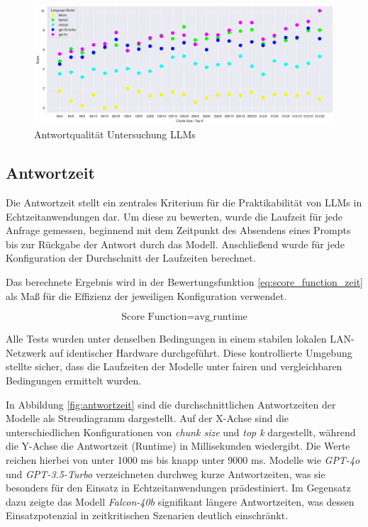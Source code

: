 \begin{figure}[H]
    \centering
    \includegraphics[width=1\textwidth]{img/antwortquali.png}
    \caption{Antwortqualität Untersuchung \acp{LLM}}
    \label{fig:antwortqualität}
\end{figure}

\subsection{Antwortzeit}

Die Antwortzeit stellt ein zentrales Kriterium für die Praktikabilität von \acp{LLM} in Echtzeitanwendungen dar. Um diese zu bewerten, wurde die Laufzeit für jede Anfrage gemessen, beginnend mit dem Zeitpunkt des Absendens eines Prompts bis zur Rückgabe der Antwort durch das Modell.
Anschließend wurde für jede Konfiguration der Durchschnitt der Laufzeiten berechnet.

Das berechnete Ergebnis wird in der Bewertungsfunktion \ref{eq:score_function_zeit} als Maß für die Effizienz der jeweiligen Konfiguration verwendet.

\begin{equation}
    \mbox{Score Function} = \mbox{avg\_runtime}
    \label{eq:score_function_zeit}
\end{equation}

Alle Tests wurden unter denselben Bedingungen in einem stabilen lokalen LAN-Netzwerk auf identischer Hardware durchgeführt. 
Diese kontrollierte Umgebung stellte sicher, dass die Laufzeiten der Modelle unter fairen und vergleichbaren Bedingungen ermittelt wurden.

In Abbildung \ref{fig:antwortzeit} sind die durchschnittlichen Antwortzeiten der Modelle als Streudiagramm dargestellt. 
Auf der X-Achse sind die unterschiedlichen Konfigurationen von \textit{chunk size} und \textit{top k} dargestellt, während die Y-Achse die Antwortzeit (Runtime) in Millisekunden wiedergibt. 
Die Werte reichen hierbei von unter 1000 ms bis knapp unter 9000 ms.
Modelle wie \textit{GPT-4o} und \textit{GPT-3.5-Turbo} verzeichneten durchweg kurze Antwortzeiten, was sie besonders für den Einsatz in Echtzeitanwendungen prädestiniert. 
Im Gegensatz dazu zeigte das Modell \textit{Falcon-40b} signifikant längere Antwortzeiten, was dessen Einsatzpotenzial in zeitkritischen Szenarien deutlich einschränkt.

